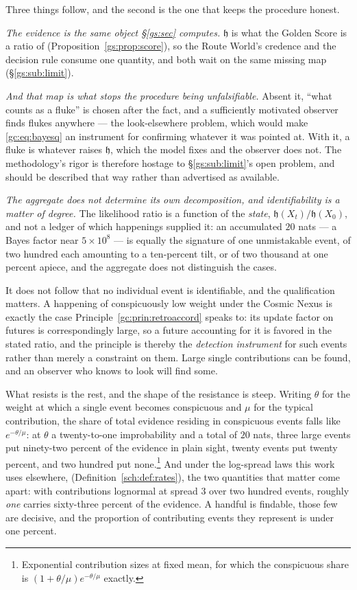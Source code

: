 \documentclass[11pt]{article}
\numberwithin{equation}{section}
\theoremstyle{plain}
\theoremstyle{definition}
\theoremstyle{remark}
\newcommand{\hm}{\mathfrak{h}}
\begin{document}
Three things follow, and the second is the one that keeps the procedure
honest.

\emph{The evidence is the same object \S\ref{gs:sec} computes.} $\hm$ is
what the Golden Score is a ratio of (Proposition~\ref{gs:prop:score}),
so the Route World's credence and the decision rule consume one
quantity, and both wait on the same missing map
(\S\ref{gs:sub:limit}).

\emph{And that map is what stops the procedure being unfalsifiable.}
Absent it, ``what counts as a fluke'' is chosen after the fact, and a
sufficiently motivated observer finds flukes anywhere --- the
look-elsewhere problem, which would make \eqref{gc:eq:bayesq} an
instrument for confirming whatever it was pointed at. With it, a fluke
is whatever raises $\hm$, which the model fixes and the observer does
not. The methodology's rigor is therefore hostage to
\S\ref{gs:sub:limit}'s open problem, and should be described that way
rather than advertised as available.

\emph{The aggregate does not determine its own decomposition, and
identifiability is a matter of degree.} The likelihood ratio is a
function of the \emph{state}, $\hm(X_t)/\hm(X_0)$, and not a ledger of
which happenings supplied it: an accumulated $20$ nats --- a Bayes factor
near $5\times10^{8}$ --- is equally the signature of one unmistakable
event, of two hundred each amounting to a ten-percent tilt, or of two
thousand at one percent apiece, and the aggregate does not distinguish
the cases.

It does not follow that no individual event is identifiable, and the
qualification matters. A happening of conspicuously low weight under the
Cosmic Nexus is exactly the case
Principle~\ref{gc:prin:retroaccord} speaks to: its update factor on
futures is correspondingly large, so a future accounting for it is
favored in the stated ratio, and the principle is thereby the
\emph{detection instrument} for such events rather than merely a
constraint on them. Large single contributions can be found, and an
observer who knows to look will find some.

What resists is the rest, and the shape of the resistance is steep.
Writing $\theta$ for the weight at which a single event becomes
conspicuous and $\mu$ for the typical contribution, the share of total
evidence residing in conspicuous events falls like $e^{-\theta/\mu}$: at
$\theta$ a twenty-to-one improbability and a total of $20$ nats, three
large events put ninety-two percent of the evidence in plain sight,
twenty events put twenty percent, and two hundred put
none.\footnote{Exponential contribution sizes at fixed mean, for which
the conspicuous share is $(1+\theta/\mu)e^{-\theta/\mu}$ exactly.} And
under the log-spread laws this work uses elsewhere,
(Definition~\ref{sch:def:rates}), the two quantities that matter come
apart: with contributions lognormal at spread $3$ over two hundred
events, roughly \emph{one} carries sixty-three percent of the evidence.
A handful is findable, those few are decisive, and the proportion of
contributing events they represent is under one percent.
\end{document}
